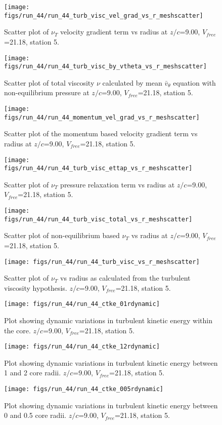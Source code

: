 \begin{figure}[H]
\centering
\texttt{[image: figs/run\_44/run\_44\_turb\_visc\_vel\_grad\_vs\_r\_meshscatter]}
\caption{Scatter plot of $\nu_T$ velocity gradient term vs radius at $z/c$=9.00, $V_{free}$=21.18, station 5.}
\end{figure}


\begin{figure}[H]
\centering
\texttt{[image: figs/run\_44/run\_44\_turb\_visc\_by\_vtheta\_vs\_r\_meshscatter]}
\caption{Scatter plot of total viscosity $\nu$ calculated by mean $\bar{v}_{\theta}$ equation with non-equilibrium pressure at $z/c$=9.00, $V_{free}$=21.18, station 5.}
\end{figure}


\begin{figure}[H]
\centering
\texttt{[image: figs/run\_44/run\_44\_momentum\_vel\_grad\_vs\_r\_meshscatter]}
\caption{Scatter plot of the momentum based velocity gradient term vs radius at $z/c$=9.00, $V_{free}$=21.18, station 5.}
\end{figure}


\begin{figure}[H]
\centering
\texttt{[image: figs/run\_44/run\_44\_turb\_visc\_ettap\_vs\_r\_meshscatter]}
\caption{Scatter plot of $\nu_T$ pressure relaxation term vs radius at $z/c$=9.00, $V_{free}$=21.18, station 5.}
\end{figure}


\begin{figure}[H]
\centering
\texttt{[image: figs/run\_44/run\_44\_turb\_visc\_total\_vs\_r\_meshscatter]}
\caption{Scatter plot of non-equilibrium based $\nu_T$ vs radius at $z/c$=9.00, $V_{free}$=21.18, station 5.}
\end{figure}


\begin{figure}[H]
\centering
\texttt{[image: figs/run\_44/run\_44\_turb\_visc\_vs\_r\_meshscatter]}
\caption{Scatter plot of $\nu_T$ vs radius as calculated from the turbulent viscosity hypothesis. $z/c$=9.00, $V_{free}$=21.18, station 5.}
\end{figure}


\begin{figure}[H]
\centering
\texttt{[image: figs/run\_44/run\_44\_ctke\_01rdynamic]}
\caption{Plot showing dynamic variations in turbulent kinetic energy within the core. $z/c$=9.00, $V_{free}$=21.18, station 5.}
\end{figure}


\begin{figure}[H]
\centering
\texttt{[image: figs/run\_44/run\_44\_ctke\_12rdynamic]}
\caption{Plot showing dynamic variations in turbulent kinetic energy between 1 and 2 core radii. $z/c$=9.00, $V_{free}$=21.18, station 5.}
\end{figure}


\begin{figure}[H]
\centering
\texttt{[image: figs/run\_44/run\_44\_ctke\_005rdynamic]}
\caption{Plot showing dynamic variations in turbulent kinetic energy between 0 and 0.5 core radii. $z/c$=9.00, $V_{free}$=21.18, station 5.}
\end{figure}


